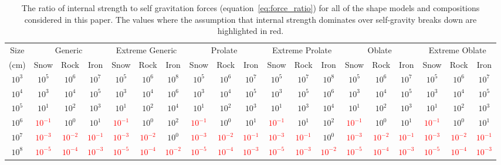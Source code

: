 \documentclass[fleqn,usenatbib]{mnras}
\newcommand{\red}[1]{\textcolor{red}{#1}}
\begin{document}
\begin{table*}
	\centering
	\caption{The ratio of internal strength to self gravitation forces (equation~\ref{eq:force_ratio}) for all of the shape models and compositions considered in this paper. The values where the assumption that internal strength dominates over self-gravity breaks down are highlighted in red.}
	\label{tab:force_ratio}
	\begin{tabular}{ccccccccccccccccccc} %
		\hline
		 Size & \multicolumn{3}{c}{Generic} & \multicolumn{3}{c}{Extreme Generic} & \multicolumn{3}{c}{Prolate} & \multicolumn{3}{c}{Extreme Prolate} & \multicolumn{3}{c}{Oblate} & \multicolumn{3}{c}{Extreme Oblate} \\
		 (cm) & Snow & Rock & Iron & Snow & Rock & Iron & Snow & Rock & Iron & Snow & Rock & Iron & Snow & Rock & Iron & Snow & Rock & Iron  \\
		\hline
		$10^{3}$ & $10^{5}$ & $10^{6}$ & $10^{7}$ & $10^{5}$ & $10^{6}$ & $10^{8}$ & $10^{5}$ & $10^{6}$ & $10^{7}$ & $10^{5}$ & $10^{7}$ & $10^{8}$ & $10^{5}$ & $10^{6}$ & $10^{7}$ & $10^{5}$ & $10^{6}$ & $10^{7}$ \\
		$10^{4}$ & $10^{3}$ & $10^{4}$ & $10^{5}$ & $10^{3}$ & $10^{4}$ & $10^{6}$ & $10^{3}$ & $10^{4}$ & $10^{5}$ & $10^{3}$ & $10^{5}$ & $10^{6}$ & $10^{3}$ & $10^{4}$ & $10^{5}$ & $10^{3}$ & $10^{4}$ & $10^{5}$ \\
		$10^{5}$ & $10^{1}$ & $10^{2}$ & $10^{3}$ & $10^{1}$ & $10^{2}$ & $10^{4}$ & $10^{1}$ & $10^{2}$ & $10^{3}$ & $10^{1}$ & $10^{3}$ & $10^{4}$ & $10^{1}$ & $10^{2}$ & $10^{3}$ & $10^{1}$ & $10^{2}$ & $10^{3}$ \\
		$10^{6}$ & \red{$10^{-1}$} & $10^{0}$ & $10^{1}$ & \red{$10^{-1}$} & $10^{0}$ & $10^{2}$ & \red{$10^{-1}$} & $10^{0}$ & $10^{1}$ & \red{$10^{-1}$} & $10^{1}$ & $10^{2}$ & \red{$10^{-1}$} & $10^{0}$ & $10^{1}$ & \red{$10^{-1}$} & $10^{0}$ & $10^{1}$ \\
		$10^{7}$ & \red{$10^{-3}$} & \red{$10^{-2}$} & \red{$10^{-1}$} & \red{$10^{-3}$} & \red{$10^{-2}$} & $10^{0}$ & \red{$10^{-3}$} & \red{$10^{-2}$} & \red{$10^{-1}$} & \red{$10^{-3}$} & \red{$10^{-1}$} & $10^{0}$ & \red{$10^{-3}$} & \red{$10^{-2}$} & \red{$10^{-1}$} & \red{$10^{-3}$} & \red{$10^{-2}$} & \red{$10^{-1}$} \\
		$10^{8}$ & \red{$10^{-5}$} & \red{$10^{-4}$} & \red{$10^{-3}$} & \red{$10^{-5}$} & \red{$10^{-4}$} & \red{$10^{-2}$} & \red{$10^{-5}$} & \red{$10^{-4}$} & \red{$10^{-3}$} & \red{$10^{-5}$} & \red{$10^{-3}$} & \red{$10^{-2}$} & \red{$10^{-5}$} & \red{$10^{-4}$} & \red{$10^{-3}$} & \red{$10^{-5}$} & \red{$10^{-4}$} & \red{$10^{-3}$} \\
		\hline
	\end{tabular}
\end{table*}
\end{document}
